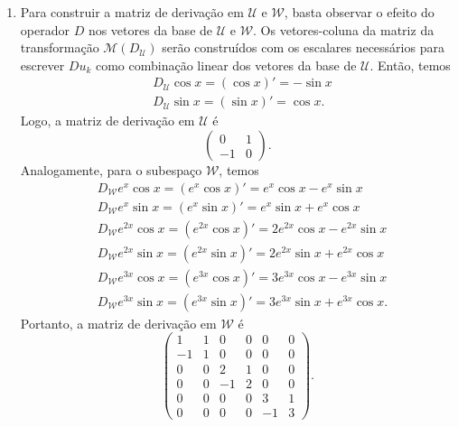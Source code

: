 \documentclass{article}
\begin{document}
\begin{enumerate}
    \item[\textbf{E12}] Para construir a matriz de derivação em \(\mathcal{U}\) e \(\mathcal{W}\), basta observar o efeito do operador \(D\) nos vetores da base de \(\mathcal{U}\) e \(\mathcal{W}\). 
    Os vetores-coluna da matriz da transformação \(\mathcal{M}(D_\mathcal{U})\) serão construídos com os escalares necessários para escrever \(Du_k\) como combinação linear dos vetores da base de \(\mathcal{U}\).
    Então, temos
    \begin{align*}
        &D_\mathcal{U}\cos x = (\cos x)' = -\sin x\\
        &D_\mathcal{U}\sin x = (\sin x)' = \cos x.
    \end{align*}
    \noindent Logo, a matriz de derivação em \(\mathcal{U}\) é \[
        \begin{pmatrix}
            0 & 1\\
            -1 & 0
        \end{pmatrix}.
        \]
    Analogamente, para o subespaço \(\mathcal{W}\), temos
    \begin{align*}
        &D_\mathcal{W} e^x \cos x = (e^x \cos x)' = e^x \cos x - e^x \sin x\\
        &D_\mathcal{W} e^x \sin x = (e^x \sin x)' = e^x \sin x + e^x \cos x\\
        &D_\mathcal{W} e^{2x} \cos x = (e^{2x} \cos x)' = 2e^{2x} \cos x - e^{2x} \sin x\\
        &D_\mathcal{W} e^{2x} \sin x = (e^{2x} \sin x)' = 2e^{2x} \sin x + e^{2x} \cos x\\
        &D_\mathcal{W} e^{3x} \cos x = (e^{3x} \cos x)' = 3e^{3x} \cos x - e^{3x} \sin x\\
        &D_\mathcal{W} e^{3x} \sin x = (e^{3x} \sin x)' = 3e^{3x} \sin x + e^{3x} \cos x.
    \end{align*}
    \noindent Portanto, a matriz de derivação em \(\mathcal{W}\) é \[
        \begin{pmatrix}
            1 & 1 & 0 & 0 & 0 & 0\\
            -1 & 1 & 0 & 0 & 0 & 0\\
            0 & 0 & 2 & 1 & 0 & 0\\
            0 & 0 & -1 & 2 & 0 & 0\\
            0 & 0 & 0 & 0 & 3 & 1\\
            0 & 0 & 0 & 0 & -1 & 3
        \end{pmatrix}.
        \]
     
\end{enumerate}
\end{document}
